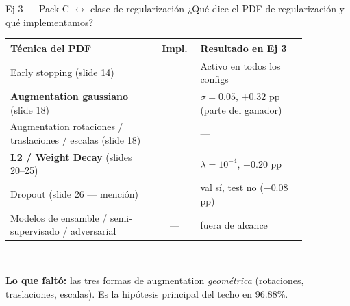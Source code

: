 \documentclass[11pt,aspectratio=169]{beamer}
\newcommand{\ok}{\textcolor{good}{\ding{52}}}
\newcommand{\nok}{\textcolor{warn}{\ding{56}}}
\begin{document}
\begin{frame}{Ej 3 — Pack C $\leftrightarrow$ clase de regularización}
\small ¿Qué dice el PDF de regularización y qué implementamos?\\[0.3em]

\centering\footnotesize
\begin{tabular}{@{}p{0.50\linewidth}cp{0.36\linewidth}@{}}
\toprule
\textbf{Técnica del PDF} & \textbf{Impl.} & \textbf{Resultado en Ej 3} \\
\midrule
Early stopping (slide 14)                       & \ok & Activo en todos los configs \\
\rowcolor{accent2!10}
\textbf{Augmentation gaussiano} (slide 18)      & \ok & $\sigma=0.05$, $+0.32$ pp (parte del ganador) \\
Augmentation rotaciones / traslaciones / escalas (slide 18) & \nok & --- \\
\rowcolor{accent2!10}
\textbf{L2 / Weight Decay} (slides 20--25)      & \ok & $\lambda = 10^{-4}$, $+0.20$ pp \\
Dropout (slide 26 — mención)                    & \ok & val sí, test no ($-0.08$ pp) \\
Modelos de ensamble / semi-supervisado / adversarial & --- & fuera de alcance \\
\bottomrule
\end{tabular}\\[0.6em]

\begin{insight}
\textbf{Lo que faltó:} las tres formas de augmentation \emph{geométrica} (rotaciones, traslaciones, escalas). Es la hipótesis principal del techo en 96.88\%.
\end{insight}
\end{frame}
\end{document}

